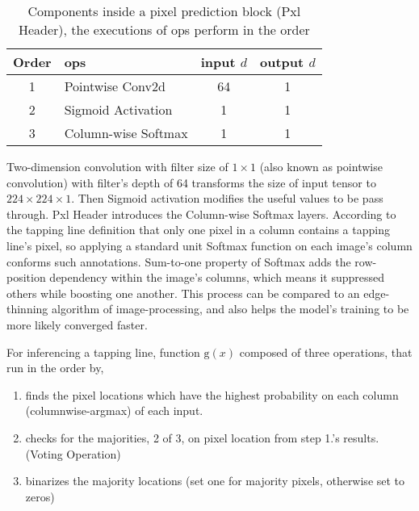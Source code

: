 \documentclass[default,pdflatex,iicol]{sn-jnl}%
\begin{document}
\begin{table}[]
\centering
\caption{Components inside a pixel prediction block (Pxl Header), the executions of ops perform in the order}
\label{tab-pxlheader}
\begin{minipage}{\linewidth}
\begin{center}
\begin{tabular}{@{}clcc@{}}%
Order 	& ops 	& \textbf{input} $d$\footnotemark[1]  & \textbf{output} $d$\footnotemark[1]	\\ \midrule
1	& Pointwise Conv2d	& 64  & 1 \\
2	& Sigmoid Activation	& 1  & 1 \\
3	& Column-wise Softmax   & 1 & 1 \\ \bottomrule
\end{tabular}%
\end{center}
\end{minipage}
\end{table}

Two-dimension convolution with filter size of $1\times1$ (also known as pointwise convolution) with filter's depth of 64 transforms the size of input tensor to $224\times 224\times 1$. Then Sigmoid activation modifies the useful values to be pass through. Pxl Header introduces the Column-wise Softmax layers. According to the tapping line definition that only one pixel in a column contains a tapping line's pixel, so applying a standard unit Softmax function on each image's column conforms such annotations. Sum-to-one property of Softmax adds the row-position dependency within the image's columns, which means it suppressed others while boosting one another. This process can be compared to an edge-thinning algorithm of image-processing, and also helps the model's training to be more likely converged faster. 

For inferencing a tapping line, function $\mathrm{g}(x)$ composed of three operations, that run in the order by,
\begin{enumerate}
\item finds the pixel locations which have the highest probability on each column (columnwise-argmax) of each input.
\item checks for the majorities, 2 of 3, on pixel location from step 1.'s results. (Voting Operation)
\item binarizes the majority locations (set one for majority pixels, otherwise set to zeros)
\end{enumerate}
\end{document}
